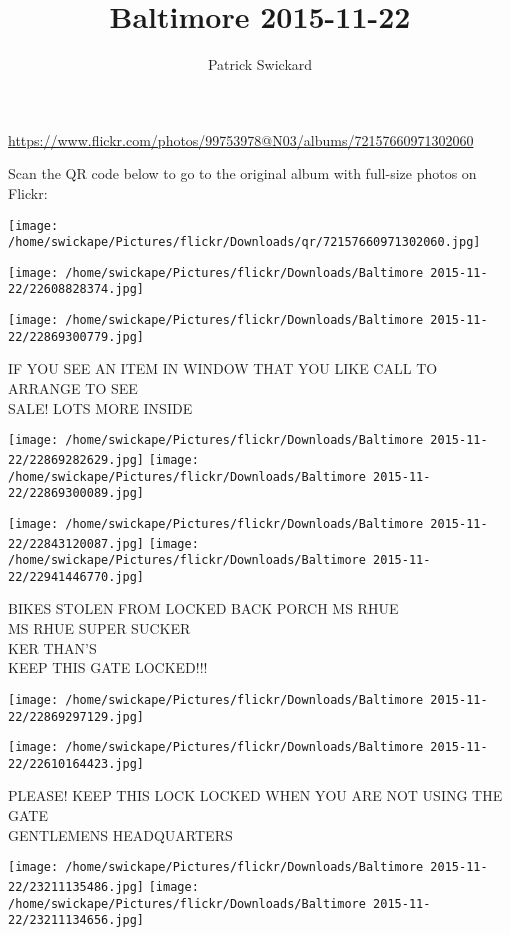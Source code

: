 \documentclass[10pt,letterpaper]{article}
\title{Baltimore 2015-11-22}
\author{Patrick Swickard}
\date{}
\begin{document}
\maketitle

\url{https://www.flickr.com/photos/99753978@N03/albums/72157660971302060}

Scan the QR code below to go to the original album with full-size photos on Flickr:

\texttt{[image: /home/swickape/Pictures/flickr/Downloads/qr/72157660971302060.jpg]}
\pagebreak

\texttt{[image: /home/swickape/Pictures/flickr/Downloads/Baltimore 2015-11-22/22608828374.jpg]}

\vspace{0.25in}
\texttt{[image: /home/swickape/Pictures/flickr/Downloads/Baltimore 2015-11-22/22869300779.jpg]}

IF YOU SEE AN ITEM IN WINDOW THAT YOU LIKE CALL TO ARRANGE TO SEE\\
SALE!  LOTS MORE INSIDE
\pagebreak

\texttt{[image: /home/swickape/Pictures/flickr/Downloads/Baltimore 2015-11-22/22869282629.jpg]}
\texttt{[image: /home/swickape/Pictures/flickr/Downloads/Baltimore 2015-11-22/22869300089.jpg]}

\texttt{[image: /home/swickape/Pictures/flickr/Downloads/Baltimore 2015-11-22/22843120087.jpg]}
\texttt{[image: /home/swickape/Pictures/flickr/Downloads/Baltimore 2015-11-22/22941446770.jpg]}

BIKES STOLEN FROM LOCKED BACK PORCH MS RHUE\\
MS RHUE SUPER SUCKER\\
KER THAN'S\\
KEEP THIS GATE LOCKED!!!
\pagebreak

\texttt{[image: /home/swickape/Pictures/flickr/Downloads/Baltimore 2015-11-22/22869297129.jpg]}

\vspace{0.25in}
\texttt{[image: /home/swickape/Pictures/flickr/Downloads/Baltimore 2015-11-22/22610164423.jpg]}

PLEASE!  KEEP THIS LOCK LOCKED WHEN YOU ARE NOT USING THE GATE\\
GENTLEMENS HEADQUARTERS
\pagebreak

\texttt{[image: /home/swickape/Pictures/flickr/Downloads/Baltimore 2015-11-22/23211135486.jpg]}
\texttt{[image: /home/swickape/Pictures/flickr/Downloads/Baltimore 2015-11-22/23211134656.jpg]}
\end{document}
